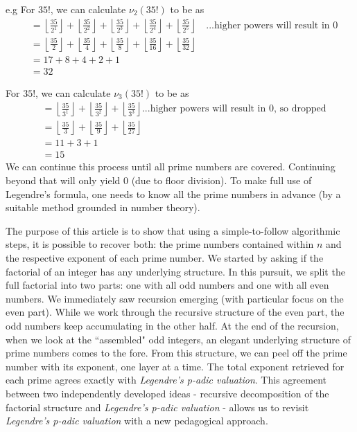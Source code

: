 \documentclass[10 pt,a4paper, article]{amsart}
\begin{document}
e.g For $35!$, we can calculate $\nu_2(35!)$ to be as 
\begin{align*}
&= \left\lfloor \frac{35}{2^1} \right\rfloor + \left\lfloor \frac{35}{2^2} \right\rfloor + \left\lfloor \frac{35}{2^3} \right\rfloor + \left\lfloor \frac{35}{2^4} \right\rfloor + \left\lfloor \frac{35}{2^5} \right\rfloor \quad \text{...higher powers will result in 0} \\
&= \left\lfloor \frac{35}{2} \right\rfloor + \left\lfloor \frac{35}{4} \right\rfloor + \left\lfloor \frac{35}{8} \right\rfloor + \left\lfloor \frac{35}{16} \right\rfloor + \left\lfloor \frac{35}{32} \right\rfloor \\
&= 17 + 8 + 4 + 2 + 1 \\
&= 32
\end{align*}

For $35!$, we can calculate $\nu_3(35!)$ to be as 
\begin{align*}
&= \left\lfloor \frac{35}{3^1} \right\rfloor + \left\lfloor \frac{35}{3^2} \right\rfloor + \left\lfloor \frac{35}{3^3} \right\rfloor \text{...higher powers will result in 0, so dropped} \\
&= \left\lfloor \frac{35}{3} \right\rfloor + \left\lfloor \frac{35}{9} \right\rfloor + \left\lfloor \frac{35}{27} \right\rfloor \\
&= 11 + 3 + 1 \\
&= 15
\end{align*}
We can continue this process until all prime numbers are covered. Continuing beyond that will only yield 0 (due to floor division). To make full use of Legendre's formula, one needs to know all the prime numbers in advance (by a suitable method grounded in number theory).

The purpose of this article is to show that using a simple-to-follow algorithmic steps, it is possible to recover both: the prime numbers contained within $n$ and the respective exponent of each prime number. We started by asking if the factorial of an integer has any underlying structure. In this pursuit, we split the full factorial into two parts: one with all odd numbers and one with all even numbers. We immediately saw recursion emerging (with particular focus on the even part). While we work through the recursive structure of the even part, the odd numbers keep accumulating in the other half. At the end of the recursion, when we look at the ``assembled" odd integers, an elegant underlying structure of prime numbers comes to the fore. From this structure, we can peel off the prime number with its exponent, one layer at a time. The total exponent retrieved for each prime agrees exactly with \emph{Legendre's p-adic valuation}. This agreement between two independently developed ideas - recursive decomposition of the factorial structure and \emph{Legendre's p-adic valuation} - allows us to revisit \emph{Legendre's p-adic valuation} with a new pedagogical approach. 
\end{document}
